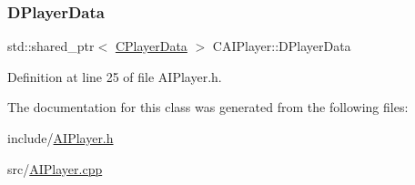 \subsubsection{\texorpdfstring{D\+Player\+Data}{DPlayerData}}
{\footnotesize\ttfamily std\+::shared\+\_\+ptr$<$ \hyperlink{classCPlayerData}{C\+Player\+Data} $>$ C\+A\+I\+Player\+::\+D\+Player\+Data\hspace{0.3cm}{\ttfamily [protected]}}



Definition at line 25 of file A\+I\+Player.\+h.



The documentation for this class was generated from the following files\+:\begin{DoxyCompactItemize}
\item 
include/\hyperlink{AIPlayer_8h}{A\+I\+Player.\+h}\item 
src/\hyperlink{AIPlayer_8cpp}{A\+I\+Player.\+cpp}\end{DoxyCompactItemize}
